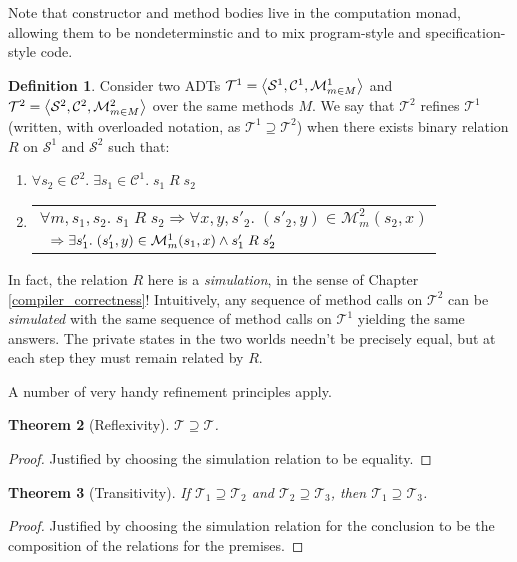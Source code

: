 \documentclass{amsbook}
\newtheorem{theorem}{Theorem}[chapter]
\theoremstyle{definition}
\newtheorem{definition}[theorem]{Definition}
\theoremstyle{remark}
\numberwithin{section}{chapter}
\numberwithin{equation}{chapter}
\begin{document}
Note that constructor and method bodies live in the computation monad, allowing them to be nondeterminstic and to mix program-style and specification-style code.

\begin{definition}
  Consider two ADTs $\mathcal T^1 = {\left \langle \mathcal S^1, \mathcal C^1, \mathcal M^1_{m \in M} \right \rangle}$ and $\mathcal T^2 = {\left \langle \mathcal S^2, \mathcal C^2, \mathcal M^2_{m \in M} \right \rangle}$ over the same methods $M$.
  We say that $\mathcal T^2$ refines $\mathcal T^1$ (written, with overloaded notation, as $\mathcal T^1 \supseteq \mathcal T^2$) when there exists binary relation $R$ on $\mathcal S^1$ and $\mathcal S^2$ such that:
  \begin{enumerate}
  \item $\forall s_2 \in \mathcal C^2. \; \exists s_1 \in \mathcal C^1. \; s_1 \; R \; s_2$
  \item \begin{tabular}{l}
    $\forall m, s_1, s_2. \; s_1 \; R \; s_2 \Rightarrow \forall x, y, s'_2. \; (s'_2, y) \in \mathcal M^2_m(s_2, x)$ \\
    $\hspace{.1in} \Rightarrow \exists s'_1. \; (s'_1, y) \in \mathcal M^1_m(s_1, x) \land s'_1 \; R \; s'_2$
  \end{tabular}
  \end{enumerate}
\end{definition}

In fact, the relation $R$ here is a \emph{simulation}, in the sense of Chapter \ref{compiler_correctness}!
Intuitively, any sequence of method calls on $\mathcal T^2$ can be \emph{simulated} with the same sequence of method calls on $\mathcal T^1$ yielding the same answers.
The private states in the two worlds needn't be precisely equal, but at each step they must remain related by $R$.

A number of very handy refinement principles apply.

\begin{theorem}[Reflexivity]\label{adtrefl}
  $\mathcal T \supseteq \mathcal T$.
\end{theorem}
\begin{proof}
  Justified by choosing the simulation relation to be equality.
\end{proof}

\begin{theorem}[Transitivity]
  If $\mathcal T_1 \supseteq \mathcal T_2$ and $\mathcal T_2 \supseteq \mathcal T_3$, then $\mathcal T_1 \supseteq \mathcal T_3$.
\end{theorem}
\begin{proof}
  Justified by choosing the simulation relation for the conclusion to be the composition of the relations for the premises.
\end{proof}
\end{document}
